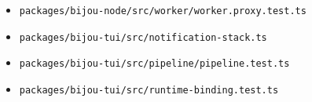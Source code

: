 \begin{itemize}
\tightlist
\item
  \texttt{p\allowbreak{}a\allowbreak{}c\allowbreak{}k\allowbreak{}a\allowbreak{}g\allowbreak{}e\allowbreak{}s\allowbreak{}/\allowbreak{}b\allowbreak{}i\allowbreak{}j\allowbreak{}o\allowbreak{}u\allowbreak{}-\allowbreak{}n\allowbreak{}o\allowbreak{}d\allowbreak{}e\allowbreak{}/\allowbreak{}s\allowbreak{}r\allowbreak{}c\allowbreak{}/\allowbreak{}w\allowbreak{}o\allowbreak{}r\allowbreak{}k\allowbreak{}e\allowbreak{}r\allowbreak{}/\allowbreak{}w\allowbreak{}o\allowbreak{}r\allowbreak{}k\allowbreak{}e\allowbreak{}r\allowbreak{}.\allowbreak{}p\allowbreak{}r\allowbreak{}o\allowbreak{}x\allowbreak{}y\allowbreak{}.\allowbreak{}t\allowbreak{}e\allowbreak{}s\allowbreak{}t\allowbreak{}.\allowbreak{}t\allowbreak{}s}
\item
  \texttt{p\allowbreak{}a\allowbreak{}c\allowbreak{}k\allowbreak{}a\allowbreak{}g\allowbreak{}e\allowbreak{}s\allowbreak{}/\allowbreak{}b\allowbreak{}i\allowbreak{}j\allowbreak{}o\allowbreak{}u\allowbreak{}-\allowbreak{}t\allowbreak{}u\allowbreak{}i\allowbreak{}/\allowbreak{}s\allowbreak{}r\allowbreak{}c\allowbreak{}/\allowbreak{}n\allowbreak{}o\allowbreak{}t\allowbreak{}i\allowbreak{}f\allowbreak{}i\allowbreak{}c\allowbreak{}a\allowbreak{}t\allowbreak{}i\allowbreak{}o\allowbreak{}n\allowbreak{}-\allowbreak{}s\allowbreak{}t\allowbreak{}a\allowbreak{}c\allowbreak{}k\allowbreak{}.\allowbreak{}t\allowbreak{}s}
\item
  \texttt{p\allowbreak{}a\allowbreak{}c\allowbreak{}k\allowbreak{}a\allowbreak{}g\allowbreak{}e\allowbreak{}s\allowbreak{}/\allowbreak{}b\allowbreak{}i\allowbreak{}j\allowbreak{}o\allowbreak{}u\allowbreak{}-\allowbreak{}t\allowbreak{}u\allowbreak{}i\allowbreak{}/\allowbreak{}s\allowbreak{}r\allowbreak{}c\allowbreak{}/\allowbreak{}p\allowbreak{}i\allowbreak{}p\allowbreak{}e\allowbreak{}l\allowbreak{}i\allowbreak{}n\allowbreak{}e\allowbreak{}/\allowbreak{}p\allowbreak{}i\allowbreak{}p\allowbreak{}e\allowbreak{}l\allowbreak{}i\allowbreak{}n\allowbreak{}e\allowbreak{}.\allowbreak{}t\allowbreak{}e\allowbreak{}s\allowbreak{}t\allowbreak{}.\allowbreak{}t\allowbreak{}s}
\item
  \texttt{p\allowbreak{}a\allowbreak{}c\allowbreak{}k\allowbreak{}a\allowbreak{}g\allowbreak{}e\allowbreak{}s\allowbreak{}/\allowbreak{}b\allowbreak{}i\allowbreak{}j\allowbreak{}o\allowbreak{}u\allowbreak{}-\allowbreak{}t\allowbreak{}u\allowbreak{}i\allowbreak{}/\allowbreak{}s\allowbreak{}r\allowbreak{}c\allowbreak{}/\allowbreak{}r\allowbreak{}u\allowbreak{}n\allowbreak{}t\allowbreak{}i\allowbreak{}m\allowbreak{}e\allowbreak{}-\allowbreak{}b\allowbreak{}i\allowbreak{}n\allowbreak{}d\allowbreak{}i\allowbreak{}n\allowbreak{}g\allowbreak{}.\allowbreak{}t\allowbreak{}e\allowbreak{}s\allowbreak{}t\allowbreak{}.\allowbreak{}t\allowbreak{}s}

\end{itemize}
